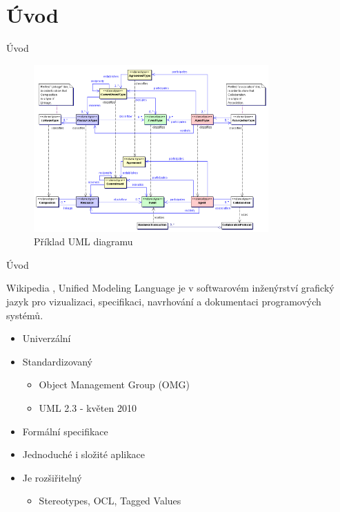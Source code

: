 \section{Úvod}



\begin{frame}{Úvod}

\begin{figure}
	\includegraphics[width=90mm]{img/uvodni_obrazek.png}
	\caption{Příklad UML diagramu}
\end{figure}
	
\end{frame}


\begin{frame}{Úvod}

\begin{block}{Wikipedia}
	, Unified Modeling Language je v softwarovém inženýrství 
	grafický jazyk pro vizualizaci, specifikaci, navrhování a 
	dokumentaci programových systémů. 
\end{block}

\pause

\begin{itemize}
	\item<+-> Univerzální
	\item<+-> Standardizovaný
	\onslide<+->
	\begin{itemize}
		\item Object Management Group (OMG)
		\item UML 2.3 - květen 2010
	\end{itemize}
	\item<+-> Formální specifikace
	\item<+-> Jednoduché i složité aplikace
	\item<+-> Je rozšiřitelný
	\onslide<+->
	\begin{itemize}
		\item Stereotypes, OCL, Tagged Values
	\end{itemize}
\end{itemize}
	
\end{frame}

